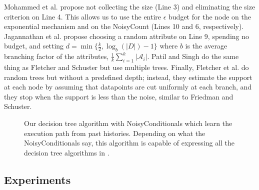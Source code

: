 \documentclass[11pt]{article}
\begin{document}
Mohammed et al. \cite{Mohammed:2015} propose not collecting the size (Line 3) and eliminating the size criterion on Line 4. This allows us to use the entire $\epsilon$ budget for the node on the exponential mechanism and on the NoisyCount (Lines 10 and 6, respectively). Jagannathan et al. \cite{Jagannathan:2009} propose choosing a random attribute on Line 9, spending no budget, and setting $d = \min\{\frac{k}{2}, \log_b(|D|)-1\}$ where $b$ is the average branching factor of the attributes, $\frac{1}{k}\sum_{i=1}^k |\mathcal{A}_i|$. Patil and Singh \cite{Singh:2014} do the same thing as Fletcher and Schuster but use multiple trees. Finally, Fletcher et al. \cite{Fletcher:2015} do random trees but without a predefined depth; instead, they estimate the support at each node by assuming that datapoints are cut uniformly at each branch, and they stop when the support is less than the noise, similar to Friedman and Schuster.
\begin{figure}
\begin{center}
\end{center}
\caption{Our decision tree algorithm with NoisyConditionals which learn the execution path from past histories. Depending on what the NoisyConditionals say, this algorithm is capable of expressing all the decision tree algorithms in \cite{Fletcher:2016}.}\label{alg:dtree}
\end{figure}
\subsection{Experiments}



\end{document}
